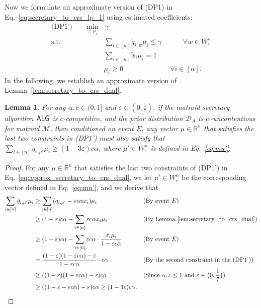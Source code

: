 \documentclass[11pt]{article}
\newcommand{\D}{\mathcal D}
\newcommand{\M}{{\mathcal M}}
\newcommand{\alg}{\textnormal{\sffamily ALG}}
\newcommand{\eps}{\varepsilon}
\newcommand{\R}{{\mathbb R}}
\newtheorem{lemma}[theorem]{Lemma}
\begin{document}
Now we formulate an approximate version of (DP1) in Eq.~\eqref{eq:secretary_to_crs_lp_1} using estimated coefficients:
\begin{align}\label{eq:approx_secretary_to_crs_dual}
    \textrm{(DP1')}\qquad\min_{\gamma,\,\mu_i}&\,\gamma\nonumber\\
    \textrm{s.t. }& \sum_{i\in[n]} \tilde{q}_{i,w}\mu_i\le\gamma \qquad\,\,\,\,\,\,\forall w\in W_{\eps}^n\nonumber\\
    & \sum_{i\in[n]}\tilde{x}_i\mu_i=1\nonumber\\
    & \mu_i\ge 0 \qquad\qquad\qquad\,\,\,\,\forall i\in [n].
\end{align}
In the following, we establish an approximate version of Lemma~\ref{lem:secretary_to_crs_dual}.
\begin{lemma}\label{lem:approx_secretary_to_crs_dual}
For any $\alpha,c\in(0,1]$ and $\eps\in\left(0,\frac{1}{7}\right)$, if the matroid secretary algorithm $\alg$ is $c$-competitive, and the prior distribution $\D_A$ is $\alpha$-uncontentious for matroid $\M$, then conditioned on event $E$, any vector $\mu\in\R^n$ that satisfies the last two constraints in (DP1') must also satisfy that $\sum_{i\in[n]} \tilde{q}_{i,\mu'}\mu_i\ge(1-3\eps)c\alpha$, where $\mu'\in W_{\eps}^n$ is defined in Eq.~\eqref{eq:mu'}.
\end{lemma}
\begin{proof}
For any $\mu\in\R^n$ that satisfies the last two constraints of (DP1') in Eq.~\eqref{eq:approx_secretary_to_crs_dual}, we let $\mu'\in W_{\eps}^n$ be the corresponding vector defined in Eq.~\eqref{eq:mu'}, and we derive that
\begin{align*}
\sum_{i\in[n]}\tilde{q}_{i,\mu'}\mu_i&\ge\sum_{i\in[n]}(q_{i,\mu'}-\eps c\alpha x_i)\mu_i &&\text{(By event $E$)}\\
&\ge(1-\eps)c\alpha-\sum_{i\in[n]}\eps c\alpha x_i\mu_i &&\text{(By Lemma~\ref{lem:secretary_to_crs_dual})}\\
&\ge(1-\eps)c\alpha-\sum_{i\in[n]}\eps c\alpha\cdot\frac{\tilde{x_i}\mu_i}{1-\eps c\alpha} &&\text{(By event $E$)}\\
&=\frac{(1-\eps)(1-\eps c\alpha)-\eps}{1-\eps c\alpha}\cdot c\alpha &&\text{(By the second constraint in the (DP1'))}\\
&\ge((1-\eps)(1-\eps c\alpha)-\eps)c\alpha &&\text{(Since $\alpha,c\le1$ and $\eps\in\big(0,\frac{1}{7}\big)$)}\\
&\ge((1-\eps-\eps c\alpha)-\eps)c\alpha\ge(1-3\eps)c\alpha.
\end{align*}
\end{proof}
\end{document}
